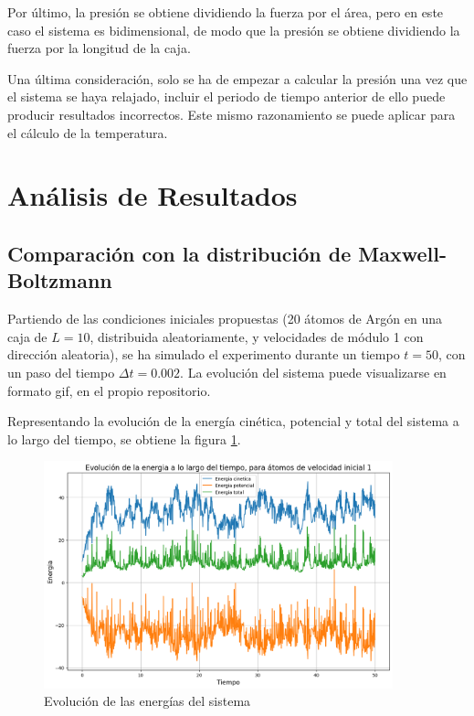 \documentclass[11pt, twoside]{article} %
\begin{document}
Por último, la presión se obtiene dividiendo la fuerza por el área, pero en este caso
el sistema es bidimensional, de modo que la presión se obtiene dividiendo la fuerza
por la longitud de la caja.

Una última consideración, solo se ha de empezar a calcular la presión una vez que el
sistema se haya relajado, incluir el periodo de tiempo anterior de ello puede producir
resultados incorrectos. Este mismo razonamiento se puede aplicar para el cálculo de
la temperatura.

\newpage

\section{Análisis de Resultados}

\subsection{Comparación con la distribución de Maxwell-Boltzmann}

Partiendo de las condiciones iniciales propuestas (20 átomos de Argón en una caja 
de $L=10$, distribuida aleatoriamente, y velocidades de módulo 1 con dirección aleatoria), se ha simulado el
experimento durante un tiempo $t = 50$, con un paso del tiempo 
$\Delta t = 0.002$. La evolución del sistema puede visualizarse en formato gif, 
en el propio repositorio.

Representando la evolución de la energía cinética, potencial y total del sistema
a lo largo del tiempo, se obtiene la figura \ref{fig:energias}.

\begin{figure}[h!]
    \centering
    \includegraphics[width=0.9\textwidth]{plots/apartado_1_energia_1.png}
    \caption{Evolución de las energías del sistema}
    \label{fig:energias}
\end{figure}
\end{document}
